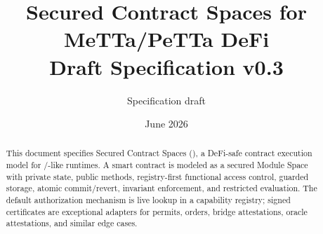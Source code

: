 \documentclass[11pt]{article}
\title{Secured Contract Spaces for MeTTa/PeTTa DeFi\\\large Draft Specification v0.3}
\author{Specification draft}
\date{June 2026}
\begin{document}
\maketitle

\begin{abstract}
This document specifies Secured Contract Spaces (\SCS{}), a DeFi-safe contract execution model for \MeTTa{}/\PeTTa{}-like runtimes. A smart contract is modeled as a secured Module Space with private state, public methods, registry-first functional access control, guarded storage, atomic commit/revert, invariant enforcement, and restricted evaluation. The default authorization mechanism is live lookup in a capability registry; signed certificates are exceptional adapters for permits, orders, bridge attestations, oracle attestations, and similar edge cases.
\end{abstract}

\tableofcontents
\newpage

























\end{document}
